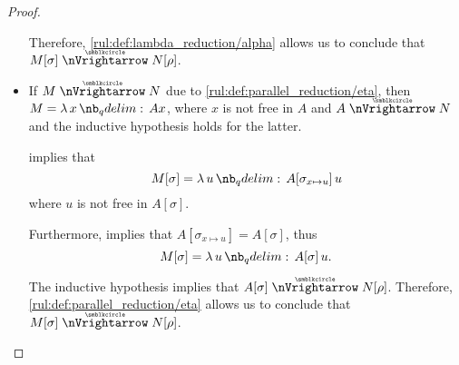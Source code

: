 \begin{proof}
\begin{itemize}
    Therefore, \ref{rul:def:lambda_reduction/alpha} allows us to conclude that \( M[\sigma] \ppred N[\rho] \).

    \item If \( M \ppred N \) due to \ref{rul:def:parallel_reduction/eta}, then \( M = \qabs x Ax \), where \( x \) is not free in \( A \) and \( A \ppred N \) and the inductive hypothesis holds for the latter.

     implies that
    \begin{equation*}
      M[\sigma] = \qabs u A[\sigma_{x \mapsto u}] \thinspace u
    \end{equation*}
    where \( u \) is not free in \( A[\sigma] \).

    Furthermore,  implies that \( A[\sigma_{x \mapsto u}] = A[\sigma] \), thus
    \begin{equation*}
      M[\sigma] = \qabs u A[\sigma] \thinspace u.
    \end{equation*}

    The inductive hypothesis implies that \( A[\sigma] \ppred N[\rho] \). Therefore, \ref{rul:def:parallel_reduction/eta} allows us to conclude that \( M[\sigma] \ppred N[\rho] \).
  \end{itemize}
\end{proof}

